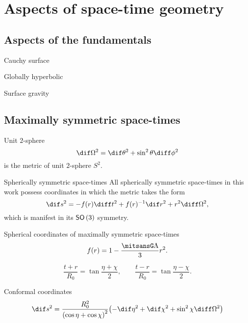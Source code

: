 \section{Aspects of space-time geometry}
\label{sec:geometry}

\subsection{Aspects of the fundamentals}


Cauchy surface

Globally hyperbolic

Surface gravity

\cite{carroll2004spacetime}

\cite{griffiths2009exact}

\subsection{Maximally symmetric space-times}

\begin{nameddef}{Unit $2$-sphere}
\begin{equation}
\dif\Omega^2 = \dif\theta^2 + \sin^2\theta\diff\phi^2
\end{equation}
is the metric of unit $2$-sphere $S^2$.
\end{nameddef}

\begin{nameddef}{Spherically symmetric space-times}
All spherically symmetric space-times in this work possess coordinates
in which the metric takes the form
\begin{equation}
\dif s^2 = -\rfun{f}{r}\diff t^2 + \rfun{f}{r}^{-1}\dif r^2
+ r^2 \diff \Omega^2,
\label{eq:generic-s-metric}
\end{equation}
which is manifest in its ${\mathsf{SO}\,}\mathopen{}\left(3\right)\mathclose{}$ symmetry.
\end{nameddef}

\begin{nameddef}{Spherical coordinates of maximally symmetric space-times}
\begin{equation}
\rfun{f}{r} = 1 - \frac{\nG\Lambda}{3}r^2.
\end{equation}
\end{nameddef}

\begin{equation}
\frac{t+r}{R_0}=\tan\frac{\eta+\chi}{2},\qquad
\frac{t-r}{R_0}=\tan\frac{\eta-\chi}{2}.
\end{equation}
\begin{nameddef}{Conformal coordinates}
\begin{equation}
\dif s^2 = \frac{R_0^2}{\rbr{\cos\eta+\cos\chi}^2}
\rbr{-\dif\eta^2+\dif\chi^2+\sin^2\chi\diff\Omega^2}
\end{equation}
\end{nameddef}

